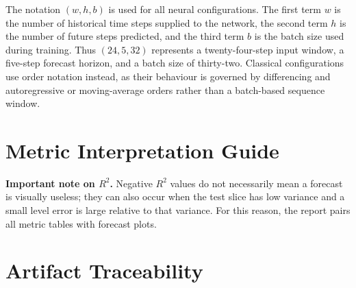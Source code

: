 \documentclass[12pt,a4paper]{article}
\begin{document}
\begin{appendices}
The notation $(w, h, b)$ is used for all neural configurations. The first term $w$ is the number of historical time steps supplied to the network, the second term $h$ is the number of future steps predicted, and the third term $b$ is the batch size used during training. Thus $(24,5,32)$ represents a twenty-four-step input window, a five-step forecast horizon, and a batch size of thirty-two. Classical configurations use order notation instead, as their behaviour is governed by differencing and autoregressive or moving-average orders rather than a batch-based sequence window.

\section{Metric Interpretation Guide}\label{app:metric-reading}

\begin{table}[H]
\centering
\caption{Interpretation guide for the reported evaluation metrics.}\label{tab:metric-guide}
\small
{}
\end{table}

\noindent\textbf{Important note on $R^2$.} Negative $R^2$ values do not necessarily mean a forecast is visually useless; they can also occur when the test slice has low variance and a small level error is large relative to that variance. For this reason, the report pairs all metric tables with forecast plots.

\section{Artifact Traceability}\label{app:artifact-traceability}


\end{appendices}
\end{document}
